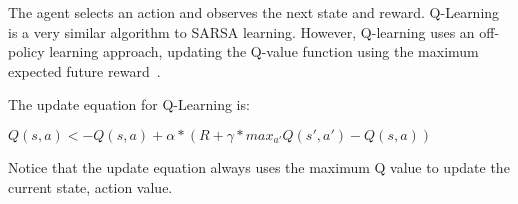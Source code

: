 The agent selects an action and observes the next state and reward.
Q-Learning is a very similar algorithm to SARSA learning. However, Q-learning uses an off-policy learning approach, updating the Q-value function using the maximum expected future reward~\citep{sutton2018reinforcement}.

The update equation for Q-Learning is:

$Q(s,a) <- Q(s,a) + \alpha*(R + \gamma*max_{a'}Q(s',a') - Q(s,a))$

Notice that the update equation always uses the maximum Q value to update the current state, action value.
